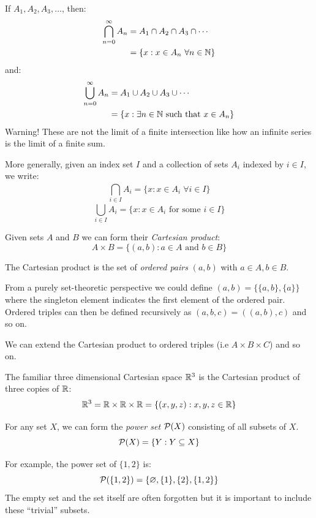 \documentclass[../main.tex]{subfiles}
\begin{document}
\begin{remark}[Notation]
  If $A_1, A_2, A_3, \ldots$, then:
  \begin{align*}
    \bigcap_{n=0}^{\infty} A_n &= A_1 \cap A_2 \cap A_3 \cap \cdots \\
                               &= \{x: x \in A_n\ \forall n \in \mathbb{N}\}
  \end{align*}
  and:
  \begin{align*}
    \bigcup_{n=0}^{\infty} A_n &= A_1 \cup A_2 \cup A_3 \cup \cdots \\
                               &= \{x: \exists n \in \mathbb{N} \text{ such that } x \in A_n\}
  \end{align*}
  Warning! These are not the limit of a finite intersection like how an infinite series is the limit of a finite sum.

  More generally, given an index set $I$ and a collection of sets $A_i$ indexed by $i \in I$, we write:
  \[
    \bigcap_{i \in I}^{} A_i = \{x: x \in A_i\;\forall i \in I\}
  \]
  \[
    \bigcup_{i \in I}^{} A_i = \{x: x \in A_i \text{ for some } i \in I\}
  \]
\end{remark}
\begin{definition}
  Given sets $A$ and $B$ we can form their \textit{Cartesian product}:
  \[
    A \times B = \{(a, b): a \in A \text{ and } b \in B\}
  \]
\end{definition}
The Cartesian product is the set of \textit{ordered pairs} $(a, b)$ with $a \in A, b \in B$.
\begin{remark}
From a purely set-theoretic perspective we could define $(a, b) = \{\{a, b\}, \{a\}\}$ where the singleton element indicates the first element of the ordered pair.
Ordered triples can then be defined recursively as $(a, b, c) = ((a, b), c)$ and so on.
\end{remark}
We can extend the Cartesian product to ordered triples (i.e $A \times B \times C$) and so on.
\begin{example}
  The familiar three dimensional Cartesian space $\mathbb{R}^3$ is the Cartesian product of three copies of $\mathbb{R}$:
  \[
    \mathbb{R}^3 = \mathbb{R} \times \mathbb{R} \times \mathbb{R} = \{(x, y, z) : x, y, z \in \mathbb{R}\}
  \]
\end{example}
\begin{definition}
  For any set $X$, we can form the \textit{power set} $\mathcal{P}(X)$ consisting of all subsets of $X$.
  \[
    \mathcal{P}(X) = \{Y: Y \subseteq X\}
  \]
\end{definition}
\begin{example}
  For example, the power set of $\{1, 2\}$ is:
  \[
    \mathcal{P}(\{1, 2\}) = \{\varnothing, \{1\}, \{2\}, \{1, 2\}\}
  \]
  The empty set and the set itself are often forgotten but it is important to include these ``trivial'' subsets.
\end{example}
\end{document}
